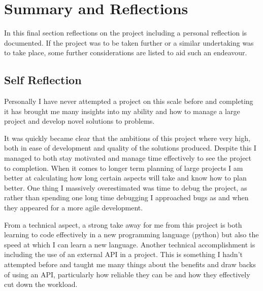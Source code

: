 \documentclass[a4paper]{article}
\begin{document}
\section{Summary and Reflections}
In this final section reflections on the project including a personal reflection is documented.
If the project was to be taken further or a similar undertaking was to take place, some further considerations are listed to aid such an endeavour.
\subsection{Self Reflection}
\par
Personally I have never attempted a project on this scale before and completing it has brought me many insights into my ability and how to manage a large project and develop novel solutions to problems.
\par
It was quickly became clear that the ambitions of this project where very high, both in ease of development and quality of the solutions produced.
Despite this I managed to both stay motivated and manage time effectively to see the project to completion.
When it comes to longer term planning of large projects I am better at calculating how long certain aspects will take and know how to plan better.
One thing I massively overestimated was time to debug the project, as rather than spending one long time debugging I approached bugs as and when they appeared for a more agile development.
\par
From a technical aspect, a strong take away for me from this project is both learning to code effectively in a new programming language (python) but also the speed at which I can learn a new language.
Another technical accomplishment is including the use of an external API in a project.
This is something I hadn't attempted before and taught me many things about the benefits and draw backs of using an API, particularly how reliable they can be and how they effectively cut down the workload.
\end{document}
